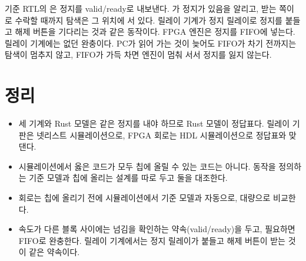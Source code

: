 \Ours 기준 RTL의 은 정지를 valid/ready로 내보낸다. 가 정지가 있음을
알리고, 받는 쪽이 로 수락할 때까지 탐색은 그 위치에 서 있다. 릴레이 기계가 정지 릴레이로
정지를 붙들고 해제 버튼을 기다리는 것과 같은 동작이다. FPGA 엔진은 정지를 FIFO에 넣는다. 릴레이 기계에는 없던
완충이다. PC가 읽어 가는 것이 늦어도 FIFO가 차기 전까지는 탐색이 멈추지 않고, FIFO가 가득 차면 엔진이 멈춰
서서 정지를 잃지 않는다.

\section{정리}

\begin{itemize}
\item 세 기계와 Rust 모델은 같은 정지를 내야 하므로 Rust 모델이 정답표다. 릴레이 기판은 넷리스트 시뮬레이션으로,
FPGA 회로는 HDL 시뮬레이션으로 정답표와 맞댄다.
\item 시뮬레이션에서 옳은 코드가 모두 칩에 올릴 수 있는 코드는 아니다. 동작을 정의하는 기준 모델과 칩에
올리는 설계를 따로 두고 둘을 대조한다.
\item 회로는 칩에 올리기 전에 시뮬레이션에서 기준 모델과 자동으로, 대량으로 비교한다.
\item 속도가 다른 블록 사이에는 넘김을 확인하는 약속(valid/ready)을 두고, 필요하면 FIFO로 완충한다. 릴레이
기계에서는 정지 릴레이가 붙들고 해제 버튼이 받는 것이 같은 약속이다.
\end{itemize}
